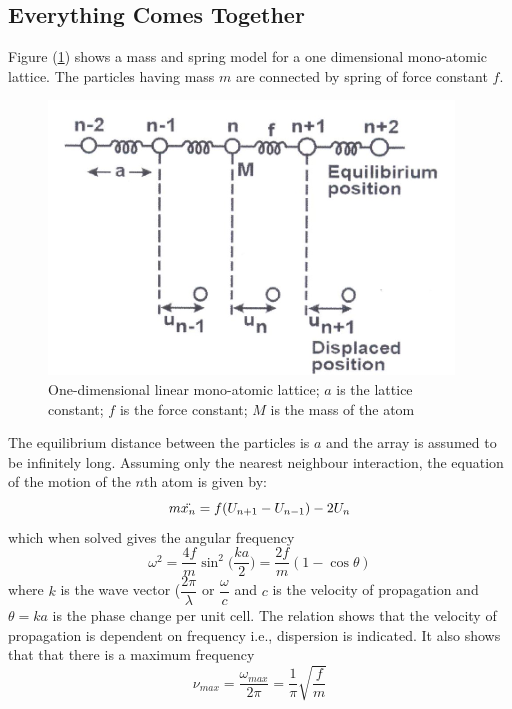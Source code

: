 \documentclass[%
 aip,
 amsmath,amssymb,
 reprint, floatfix%
]{revtex4-1}
\begin{document}
    \subsection{Everything Comes Together}
    Figure (\ref{fig:monolattice}) shows a mass and spring model for a one dimensional mono-atomic lattice. The particles having mass $m$ are connected by spring of force constant $f$.
    \begin{figure}
        \centering
        \includegraphics{Figures/monolattice.png}
        \caption{One-dimensional linear mono-atomic lattice; $a$ is the lattice constant; $f$ is the force constant; $M$ is the mass of the atom}
        \label{fig:monolattice}
    \end{figure}
    The equilibrium distance between the particles is $a$ and the array is assumed to be infinitely long. Assuming only the nearest neighbour interaction, the equation of the motion of the $n$th atom is given by:
    \begin{equation}
        m \Ddot{x_n} = f(U_{n+1}-U_{n-1}) -2U_n
    \end{equation}
    which when solved gives the angular frequency
    \begin{equation}
        \omega^2 = \dfrac{4f}{m} \sin^2 \Big(\dfrac{ka}{2}\Big) = \dfrac{2f}{m} (1 - \cos \theta)
    \end{equation}
    where $k$ is the wave vector ($\dfrac{2 \pi}{\lambda}$ or $\dfrac{\omega}{c}$ and $c$ is the velocity of propagation and $\theta = ka$ is the phase change per unit cell. The relation shows that the velocity of propagation is dependent on frequency i.e., dispersion is indicated. It also shows that that there is a maximum frequency
    \begin{equation}
        \nu_{max} = \dfrac{\omega_{max}}{2 \pi} = \dfrac{1}{\pi} \sqrt{\dfrac{f}{m}}
    \end{equation}
\end{document}
